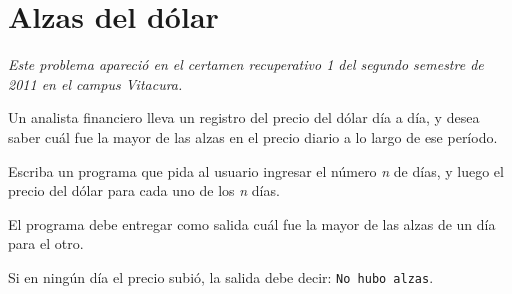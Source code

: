\section{Alzas del dólar}

\emph{Este problema apareció en el certamen recuperativo 1 del segundo
semestre de 2011 en el campus Vitacura.}

Un analista financiero lleva un registro del precio del dólar día a día,
y desea saber cuál fue la mayor de las alzas en el precio diario a lo
largo de ese período.

Escriba un programa que pida al usuario ingresar el número \emph{n} de
días, y luego el precio del dólar para cada uno de los \emph{n} días.

El programa debe entregar como salida cuál fue la mayor de las alzas de
un día para el otro.

Si en ningún día el precio subió, la salida debe decir:
\lstinline!No hubo alzas!.

